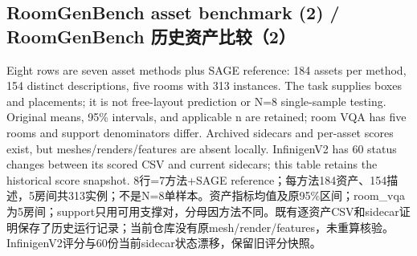 \documentclass[10pt,a4paper,fontset=fandol]{ctexart}
\begin{document}
\subsection{RoomGenBench asset benchmark (2) / RoomGenBench 历史资产比较（2）}
Eight rows are seven asset methods plus SAGE reference: 184 assets per method, 154 distinct descriptions, five rooms with 313 instances. The task supplies boxes and placements; it is not free-\allowbreak{}layout prediction or N=8 single-\allowbreak{}sample testing. Original means, 95\% intervals, and applicable n are retained; room VQA has five rooms and support denominators differ. Archived sidecars and per-\allowbreak{}asset scores exist, but meshes/\allowbreak{}renders/\allowbreak{}features are absent locally. InfinigenV2 has 60 status changes between its scored CSV and current sidecars; this table retains the historical score snapshot.
8行=7方法+SAGE reference；每方法184资产、154描述，5房间共313实例；不是N=8单样本。资产指标均值及原95\%区间；room\_\allowbreak{}vqa为5房间；support只用可用支撑对，分母因方法不同。既有逐资产CSV和sidecar证明保存了历史运行记录；当前仓库没有原mesh/\allowbreak{}render/\allowbreak{}features，未重算核验。InfinigenV2评分与60份当前sidecar状态漂移，保留旧评分快照。
\begingroup\small
\end{document}
